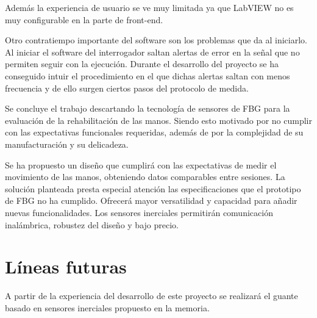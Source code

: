 \begin{itemize}
	Además la experiencia de usuario se ve muy limitada ya que LabVIEW no es muy configurable en la parte de front-end.
	
	Otro contratiempo importante del software son los problemas que da al iniciarlo. Al iniciar el software del interrogador saltan alertas de error en la señal que no permiten seguir con la ejecución. Durante el desarrollo del proyecto se ha conseguido intuir el procedimiento en el que dichas alertas saltan con menos frecuencia y de ello surgen ciertos pasos del protocolo de medida.  %
	 
	
	 
\end{itemize}

\clearpage

Se concluye el trabajo descartando la tecnología de sensores de FBG para la evaluación de la rehabilitación de las manos. Siendo esto motivado por no cumplir con las expectativas funcionales requeridas, además de por la complejidad de su manufacturación y su delicadeza. 

Se ha propuesto un diseño que cumplirá con las expectativas de medir el movimiento de las manos, obteniendo datos comparables entre sesiones. La solución planteada presta especial atención las especificaciones que el prototipo de FBG no ha cumplido. Ofrecerá mayor versatilidad y capacidad para añadir nuevas funcionalidades. Los sensores inerciales permitirán comunicación inalámbrica, robustez del diseño y bajo precio.








\section{Líneas futuras}

A partir de la experiencia del desarrollo de este proyecto se realizará el guante basado en sensores inerciales propuesto en la memoria.

